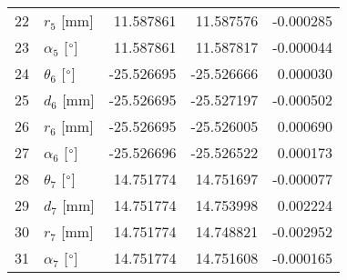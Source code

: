 \documentclass{standalone}%
\begin{document}
\begin{tabular}{llrrr}
22 &              $r_{5}$ [mm] &  11.587861 &  11.587576 &  -0.000285 \\
23 &  $\alpha_{5}$ [$\degree$] &  11.587861 &  11.587817 &  -0.000044 \\
24 &  $\theta_{6}$ [$\degree$] & -25.526695 & -25.526666 &   0.000030 \\
25 &              $d_{6}$ [mm] & -25.526695 & -25.527197 &  -0.000502 \\
26 &              $r_{6}$ [mm] & -25.526695 & -25.526005 &   0.000690 \\
27 &  $\alpha_{6}$ [$\degree$] & -25.526696 & -25.526522 &   0.000173 \\
28 &  $\theta_{7}$ [$\degree$] &  14.751774 &  14.751697 &  -0.000077 \\
29 &              $d_{7}$ [mm] &  14.751774 &  14.753998 &   0.002224 \\
30 &              $r_{7}$ [mm] &  14.751774 &  14.748821 &  -0.002952 \\
31 &  $\alpha_{7}$ [$\degree$] &  14.751774 &  14.751608 &  -0.000165 \\
\bottomrule
\end{tabular}
%
\end{document}
